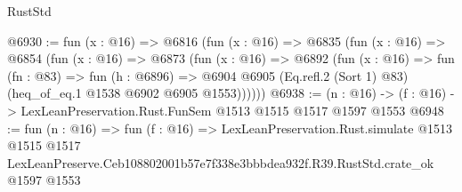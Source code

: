 \begin{lexlean}{RustStd}
\begin{coremodule}
@6930 := fun (x : @16) =>
  @6816
    (fun (x : @16) =>
    @6835
      (fun (x : @16) =>
      @6854
        (fun (x : @16) =>
        @6873
          (fun (x : @16) =>
          @6892
            (fun (x : @16) =>
            fun (fn : @83) =>
            fun (h : @6896) =>
            @6904 @6905 (Eq.refl.{2} (Sort 1) @83) (heq_of_eq.{1} @1538 @6902 @6905 @1553))))))
@6938 := (n : @16) -> (f : @16) -> LexLeanPreservation.Rust.FunSem @1513 @1515 @1517 @1597 @1553
@6948 := fun (n : @16) =>
  fun (f : @16) =>
  LexLeanPreservation.Rust.simulate
    @1513
    @1515
    @1517
    LexLeanPreserve.Ceb108802001b57e7f338e3bbbdea932f.R39.RustStd.crate_ok
    @1597
    @1553
\end{coremodule}
\end{lexlean}
